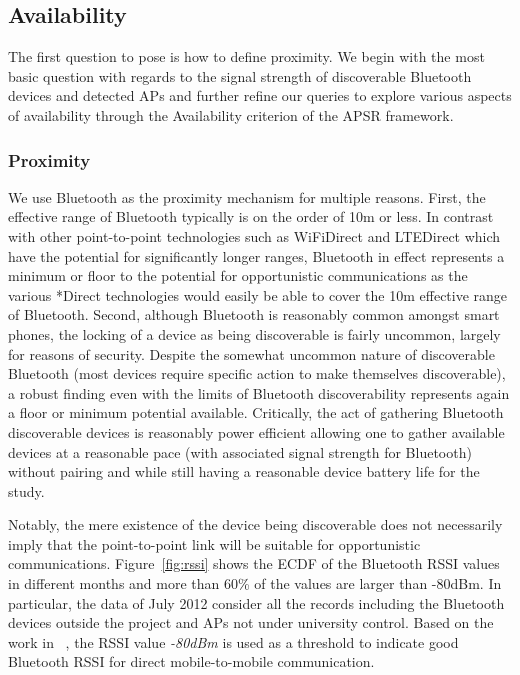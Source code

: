 \subsection{Availability}
The first question to pose is how to define proximity. We begin with the most basic question with regards to the signal strength of discoverable Bluetooth devices and detected APs and further refine our queries to explore various aspects of availability through the Availability criterion of the APSR framework. 

\subsubsection*{Proximity}
We use Bluetooth as the proximity mechanism for multiple reasons.  First, the effective range of Bluetooth typically is on the order of 10m or less.  In contrast with other point-to-point technologies such as WiFiDirect and LTEDirect which have the potential for significantly longer ranges, Bluetooth in effect represents a minimum or floor to the potential for opportunistic communications as the various *Direct technologies would easily be able to cover the 10m effective range of Bluetooth.  Second, although Bluetooth is reasonably common amongst smart phones, the locking of a device as being discoverable is fairly uncommon, largely for reasons of security.  Despite the somewhat uncommon nature of discoverable Bluetooth (most devices require specific action to make themselves discoverable), a robust finding even with the limits of Bluetooth discoverability represents again a floor or minimum potential available.  Critically, the act of gathering Bluetooth discoverable devices is reasonably power efficient allowing one to gather available devices at a reasonable pace (with associated signal strength for Bluetooth) without pairing and while still having a reasonable device battery life for the study. 

Notably, the mere existence of the device being discoverable does not necessarily imply that the point-to-point link will be suitable for opportunistic communications.  Figure~\ref{fig:rssi} shows the ECDF of the Bluetooth RSSI values in different months and more than 60\% of the values are larger than -80dBm.  In particular, the data of July 2012 consider all the records including the Bluetooth devices outside the project and APs not under university control. Based on the work in ~\cite{polastre2005telos}, the RSSI value \emph{-80dBm} is used as a threshold to indicate good Bluetooth RSSI for direct mobile-to-mobile communication.  

